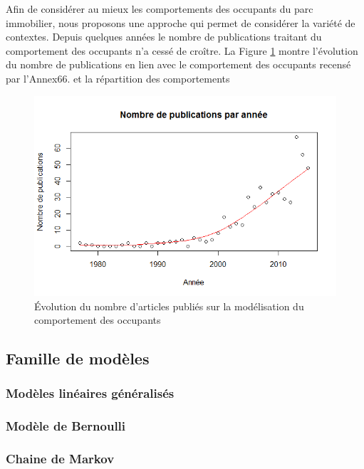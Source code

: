 Afin de considérer au mieux les comportements des occupants du parc immobilier, nous proposons une approche qui permet de considérer la variété de contextes. Depuis quelques années le nombre de publications traitant du comportement des occupants n'a cessé de croître. La Figure \ref{fig:NbPerYear} montre l'évolution du nombre de publications en lien avec le comportement des occupants recensé par l'Annex66.  et la répartition des comportements 

\begin{figure}[h]
\centering
\includegraphics[scale=0.6]{Images/NbPerYear/NbPerYear}
\caption{Évolution du nombre d'articles publiés sur la modélisation du comportement des occupants}
\label{fig:NbPerYear}
\end{figure}

\subsection{Famille de modèles}

\subsubsection{Modèles linéaires généralisés}

\subsubsection{Modèle de Bernoulli}

\subsubsection{Chaine de Markov}
\label{Chaine de Markov}

